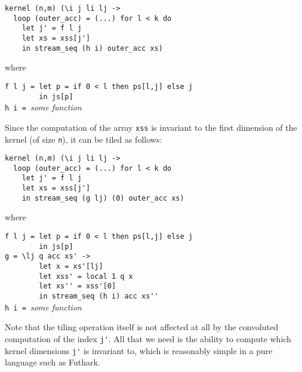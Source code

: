 \begin{lstlisting}
kernel (n,m) (\i j li lj ->
  loop (outer_acc) = (...) for l < k do
    let j' = f l j
    let xs = xss[j']
    in stream_seq (h i) outer_acc xs)
\end{lstlisting}
\begin{minipage}[t]{0.1\linewidth}
  \begin{flushright}
    where
  \end{flushright}
\end{minipage}
\begin{minipage}[t]{0.8\linewidth}
\lstinline{f l j = let p = if 0 < l then ps[l,j] else j}\\
\lstinline{        in js[p]}\\
\lstinline{h i = }\textit{some function}
\end{minipage}
\vspace{1em}

Since the computation of the array \texttt{xss} is invariant to the
first dimension of the kernel (of size \texttt{n}), it can be tiled as
follows:

\begin{lstlisting}
kernel (n,m) (\i j li lj ->
  loop (outer_acc) = (...) for l < k do
    let j' = f l j
    let xs = xss[j']
    in stream_seq (g lj) (0) outer_acc xs)
\end{lstlisting}
\begin{minipage}[t]{0.1\linewidth}
  \begin{flushright}
    where
  \end{flushright}
\end{minipage}
\begin{minipage}[t]{0.8\linewidth}
\lstinline{f l j = let p = if 0 < l then ps[l,j] else j}\\
\lstinline{        in js[p]}\\
\lstinline{g = \lj q acc xs' ->}\\
\lstinline{        let x = xs'[lj]}\\
\lstinline{        let xss' = local 1 q x}\\
\lstinline{        let xs'' = xss'[0]}\\
\lstinline{        in stream_seq (h i) acc xs''}\\
\lstinline{h i = }\textit{some function}
\end{minipage}
\vspace{1em}

Note that the tiling operation itself is not affected at all by the
convoluted computation of the index \lstinline{j'}.  All that we need
is the ability to compute which kernel dimensions \lstinline{j'} is
invariant to, which is reasonably simple in a pure language such as
Futhark.

